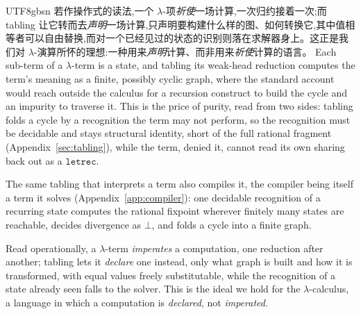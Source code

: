 \begin{CJK*}{UTF8}{gbsn}
  若作操作式的读法,一个 $\lambda$-项\emph{祈使}一场计算,一次归约接着一次;而 tabling 让它转而去\emph{声明}一场计算,只声明要构建什么样的图、如何转换它,其中值相等者可以自由替换,而对一个已经见过的状态的识别则落在求解器身上。这正是我们对 $\lambda$-演算所怀的理想:一种用来\emph{声明}计算、而非用来\emph{祈使}计算的语言。
  \else
  Each sub-term of a $\lambda$-term is a state, and tabling its weak-head reduction computes the term's meaning as a finite, possibly cyclic graph, where the standard account would reach outside the calculus for a recursion construct to build the cycle and an impurity to traverse it. This is the price of purity, read from two sides: tabling folds a cycle by a recognition the term may not perform, so the recognition must be decidable and stays structural identity, short of the full rational fragment (Appendix~\ref{sec:tabling}), while the term, denied it, cannot read its own sharing back out as a $\mathtt{letrec}$.

  The same tabling that interprets a term also compiles it, the compiler being itself a term it solves (Appendix~\ref{app:compiler}): one decidable recognition of a recurring state computes the rational fixpoint wherever finitely many states are reachable, decides divergence as $\bot$, and folds a cycle into a finite graph.

  Read operationally, a $\lambda$-term \emph{imperates} a computation, one reduction after another; tabling lets it \emph{declare} one instead, only what graph is built and how it is transformed, with equal values freely substitutable, while the recognition of a state already seen falls to the solver. This is the ideal we hold for the $\lambda$-calculus, a language in which a computation is \emph{declared}, not \emph{imperated}.
  \fi

  \fi %

  \ifTablambdaBody
  
  
  \fi

  \ifTablambdaAppendix
  \appendix


\end{CJK*}
